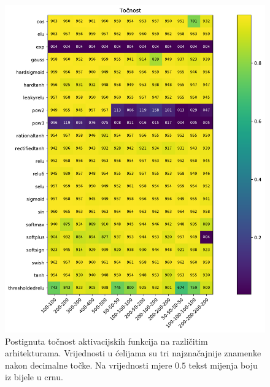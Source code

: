 \documentclass[times, utf8, numeric, diplomski]{fer}
\begin{document}
\begin{figure}[ht]
\includegraphics[width=\textwidth]{greedy_9_acc.pdf}
\centering
\caption{Postignuta točnost aktivacijskih funkcija na različitim arhitekturama. Vrijednosti u ćelijama su tri najznačajnije znamenke nakon decimalne točke. Na vrijednosti mjere $0.5$ tekst mijenja boju iz bijele u crnu.}
\label{fig:greedy_9_acc}
\end{figure}
\end{document}
